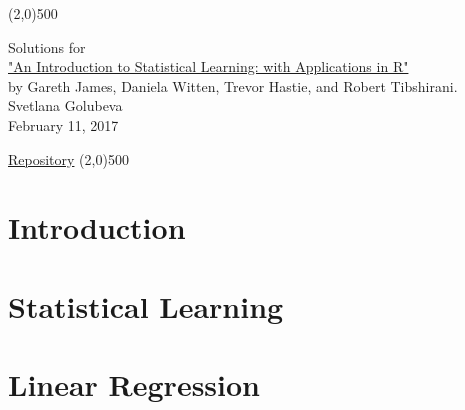 \documentclass[a4paper,12pt,titlepage]{article} %
\begin{document}
\begin{titlepage}

\begin{center}
	\line(2,0){500}
\end{center}

\vspace{60pt}

\begin{center}	
	{\Large{Solutions for}}\\
	\vspace{20pt}
	\href{http://www.springer.com/us/book/9781461471370}{\Huge{"An Introduction to Statistical Learning: with Applications in R"}}\\
	\vspace{20pt}
	{\LARGE{by Gareth James, Daniela Witten, Trevor Hastie, and Robert Tibshirani.}}\\
	\vspace{20pt}
	Svetlana Golubeva\\
	\vspace{20pt}
	February 11, 2017
\end{center}

\vspace{\fill}
\begin{center}
	\href{https://github.com/attillax/ISL}{Repository}
	\line(2,0){500}
\end{center}

\end{titlepage}

\tableofcontents
\newpage
\section{Introduction}


\newpage
\section{Statistical Learning}


\newpage
\section{Linear Regression}


\newpage
\end{document}

